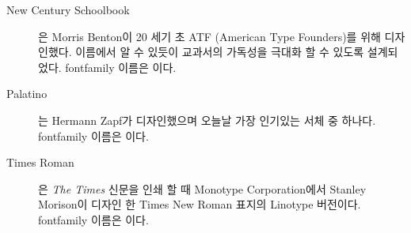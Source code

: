 \begin{description}
\item[New Century Schoolbook] {은 Morris Benton이 20 세기 초 ATF (American Type Founders)를 위해 디자인했다. 이름에서 알 수 있듯이 교과서의 가독성을 극대화 할 수 있도록 설계되었다. fontfamily 이름은 이다.

\vspace{0.5\onelineskip}
\fox\par\Kafka\par\namesAZ
\vspace{0.5\onelineskip}
}


\item[Palatino] { 는 Hermann Zapf가 디자인했으며 오늘날 가장 인기있는 서체 중 하나다. fontfamily 이름은 이다.

\vspace{0.5\onelineskip}
\fox\par\Kafka\par\namesAZ
\vspace{0.5\onelineskip}
}


\item[Times Roman] { 은 \emph{The Times} 신문을 인쇄 할 때 Monotype Corporation에서 Stanley Morison이 디자인 한 Times New Roman 표지의 Linotype 버전이다. 
fontfamily 이름은 이다.

\vspace{0.5\onelineskip}
\fox\par\Kafka\par\namesAZ
\vspace{0.5\onelineskip}
}



\end{description}
